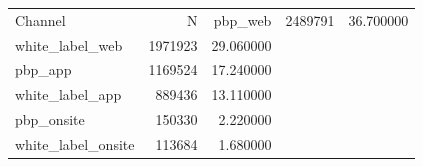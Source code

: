 \begin{tabular}{lrr}
\toprule
Channel & N & %
\midrule
pbp_web & 2489791 & 36.700000 \\
white_label_web & 1971923 & 29.060000 \\
pbp_app & 1169524 & 17.240000 \\
white_label_app & 889436 & 13.110000 \\
pbp_onsite & 150330 & 2.220000 \\
white_label_onsite & 113684 & 1.680000 \\
\bottomrule
\end{tabular}
